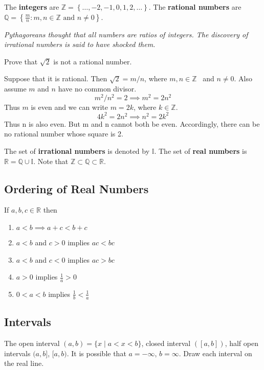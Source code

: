 \documentclass[../calc1-main.tex]{subfiles}
\begin{document}
The \textbf{integers} are $\mathbb{Z}= \left\{ \dots, -2, -1, 0,1, 2, \dots \right\}$.
The \textbf{rational numbers} are $\mathbb{Q=}\left\{ \frac{m}{n}:m,n\in \mathbb{Z}\text{ and }n\neq 0\right\}$.

\textit{Pythagoreans thought that all numbers are ratios of integers. The discovery of irrational numbers is said to have shocked them.}

\begin{example}
Prove that $\sqrt{2}$ is not a rational number.
\end{example}
\begin{solution}
  Suppose that it is rational. Then $\sqrt{2}=m/n$, where $m,n\in \mathbb{Z}$ \ and $n\neq 0$. Also assume $m$ and $n$ have no common divisor.
  \[
    m^{2}/n^{2}=2  \implies m^{2}=2n^{2}
  \]
  Thus $m$ is even and we can write $m=2k$, where $k\in \mathbb{Z}$.
  \[
    4k^{2}=2n^{2} \implies n^{2}=2k^{2}
  \]
  Thus n is also even. But m and n cannot both be even. Accordingly, there can be no rational number whose square is 2.
\end{solution}

The set of \textbf{irrational numbers} is denoted by $\mathbb{I}$.
The set of \textbf{real numbers} is $\mathbb{R} = \mathbb{Q} \cup \mathbb{I}$.
Note that $\mathbb{Z} \subset \mathbb{Q} \subset \mathbb{R}$.

\subsection*{Ordering of Real Numbers}
If $a,b,c \in \mathbb{R}$ then
\begin{enumerate}
\item $a<b \implies a+c<b+c$

\item $a<b$ and $c>0$ implies $ac<bc$

\item $a<b$ and $c<0$ implies $ac>bc$

\item $a>0$ implies $\frac{1}{a}>0$

\item $0<a<b$ implies $\frac{1}{b}<\frac{1}{a}$
\end{enumerate}

\subsection*{Intervals}

The open interval $(a,b) = \{x \mid a < x < b\}$, closed interval $([a,b])$, half open intervals $(a, b]$, $[a, b)$. It is possible that $a=-\infty$, $b=\infty$.
Draw each interval on the real line.
\end{document}
